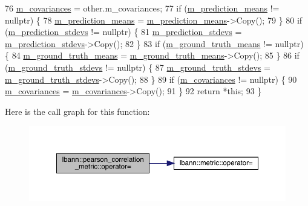 \begin{DoxyCode}
76   \hyperlink{classlbann_1_1pearson__correlation__metric_aeabb941e22f2718a59103b7ec98a9c1e}{m\_covariances}         = other.m\_covariances;
77   \textcolor{keywordflow}{if} (\hyperlink{classlbann_1_1pearson__correlation__metric_ac664eebee2c3d3287848c570400bdddb}{m\_prediction\_means} != \textcolor{keyword}{nullptr}) \{
78     \hyperlink{classlbann_1_1pearson__correlation__metric_ac664eebee2c3d3287848c570400bdddb}{m\_prediction\_means} = \hyperlink{classlbann_1_1pearson__correlation__metric_ac664eebee2c3d3287848c570400bdddb}{m\_prediction\_means}->Copy();
79   \}
80   \textcolor{keywordflow}{if} (\hyperlink{classlbann_1_1pearson__correlation__metric_ad288c4206078866feb39a4f982d8e975}{m\_prediction\_stdevs} != \textcolor{keyword}{nullptr}) \{
81     \hyperlink{classlbann_1_1pearson__correlation__metric_ad288c4206078866feb39a4f982d8e975}{m\_prediction\_stdevs} = \hyperlink{classlbann_1_1pearson__correlation__metric_ad288c4206078866feb39a4f982d8e975}{m\_prediction\_stdevs}->Copy();
82   \}
83   \textcolor{keywordflow}{if} (\hyperlink{classlbann_1_1pearson__correlation__metric_aa67f395597bf6bbf9bd57645877f26a5}{m\_ground\_truth\_means} != \textcolor{keyword}{nullptr}) \{
84     \hyperlink{classlbann_1_1pearson__correlation__metric_aa67f395597bf6bbf9bd57645877f26a5}{m\_ground\_truth\_means} = \hyperlink{classlbann_1_1pearson__correlation__metric_aa67f395597bf6bbf9bd57645877f26a5}{m\_ground\_truth\_means}->Copy();
85   \}
86   \textcolor{keywordflow}{if} (\hyperlink{classlbann_1_1pearson__correlation__metric_a7ed5e7a1778d17f852f4277afcaa31ed}{m\_ground\_truth\_stdevs} != \textcolor{keyword}{nullptr}) \{
87     \hyperlink{classlbann_1_1pearson__correlation__metric_a7ed5e7a1778d17f852f4277afcaa31ed}{m\_ground\_truth\_stdevs} = \hyperlink{classlbann_1_1pearson__correlation__metric_a7ed5e7a1778d17f852f4277afcaa31ed}{m\_ground\_truth\_stdevs}->Copy();
88   \}
89   \textcolor{keywordflow}{if} (\hyperlink{classlbann_1_1pearson__correlation__metric_aeabb941e22f2718a59103b7ec98a9c1e}{m\_covariances} != \textcolor{keyword}{nullptr}) \{
90     \hyperlink{classlbann_1_1pearson__correlation__metric_aeabb941e22f2718a59103b7ec98a9c1e}{m\_covariances} = \hyperlink{classlbann_1_1pearson__correlation__metric_aeabb941e22f2718a59103b7ec98a9c1e}{m\_covariances}->Copy();
91   \}
92   \textcolor{keywordflow}{return} *\textcolor{keyword}{this};
93 \}
\end{DoxyCode}
Here is the call graph for this function\+:\nopagebreak
\begin{figure}[H]
\begin{center}
\leavevmode
\includegraphics[width=350pt]{classlbann_1_1pearson__correlation__metric_a5b88759076bc2f827b726e1541467b56_cgraph}
\end{center}
\end{figure}
